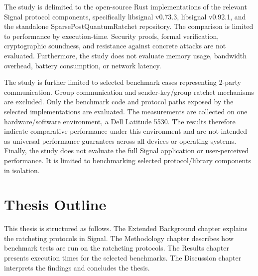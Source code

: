 The study is delimited to the open-source Rust implementations of the relevant Signal protocol components, specifically libsignal v0.73.3, libsignal v0.92.1, and the standalone SparsePostQuantumRatchet repository. The comparison is limited to performance by execution-time. Security proofs, formal verification, cryptographic soundness, and resistance against concrete attacks are not evaluated. Furthermore, the study does not evaluate memory usage, bandwidth overhead, battery consumption, or network latency.  

 

The study is further limited to selected benchmark cases representing 2-party communication. Group communication and sender-key/group ratchet mechanisms are excluded. Only the benchmark code and protocol paths exposed by the selected implementations are evaluated. The measurements are collected on one hardware/software environment, a Dell Latitude 5530. The results therefore indicate comparative performance under this environment and are not intended as universal performance guarantees across all devices or operating systems.  Finally, the study does not evaluate the full Signal application or user-perceived performance. It is limited to benchmarking selected protocol/library components in isolation. 

\section{Thesis Outline}

This thesis is structured as follows. The Extended Background chapter explains the ratcheting protocols in Signal. The Methodology chapter describes how benchmark tests are run on the ratcheting protocols. The Results chapter presents execution times for the selected benchmarks. The Discussion chapter interprets the findings and concludes the thesis.